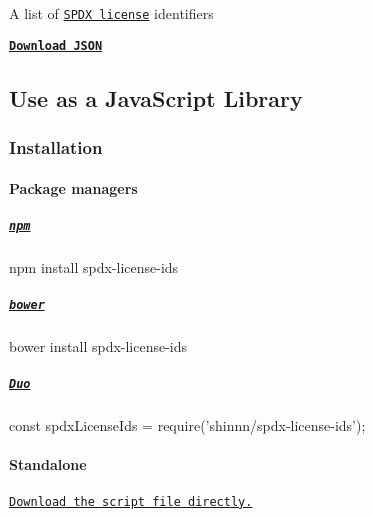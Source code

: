 A list of \href{https://spdx.org/licenses/}{\tt S\+P\+DX license} identifiers

\href{https://raw.githubusercontent.com/shinnn/spdx-license-ids/master/spdx-license-ids.json}{\tt {\bfseries Download J\+S\+ON}}

\subsection*{Use as a Java\+Script Library}

\href{https://www.npmjs.org/package/spdx-license-ids}{\tt } \href{https://github.com/shinnn/spdx-license-ids/releases}{\tt } \href{https://travis-ci.org/shinnn/spdx-license-ids}{\tt } \href{https://coveralls.io/r/shinnn/spdx-license-ids}{\tt } \href{https://david-dm.org/shinnn/spdx-license-ids#info=devDependencies}{\tt }

\subsubsection*{Installation}

\paragraph*{Package managers}

\subparagraph*{\href{https://www.npmjs.com/}{\tt npm}}


\begin{DoxyCode}
npm install spdx-license-ids
\end{DoxyCode}


\subparagraph*{\href{http://bower.io/}{\tt bower}}


\begin{DoxyCode}
bower install spdx-license-ids
\end{DoxyCode}


\subparagraph*{\href{http://duojs.org/}{\tt Duo}}


\begin{DoxyCode}
const spdxLicenseIds = require('shinnn/spdx-license-ids');
\end{DoxyCode}


\paragraph*{Standalone}

\href{https://raw.githubusercontent.com/shinnn/spdx-license-ids/master/spdx-license-ids-browser.js}{\tt Download the script file directly.}

